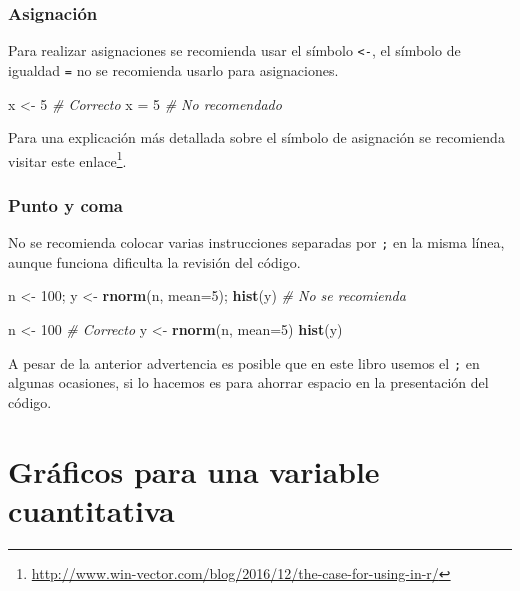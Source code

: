 \documentclass[10pt,]{krantz}
\makeatletter
\newenvironment{Shaded}{\begin{snugshade}}{\end{snugshade}}
\newcommand{\KeywordTok}[1]{\textcolor[rgb]{0.13,0.29,0.53}{\textbf{{#1}}}}
\newcommand{\DataTypeTok}[1]{\textcolor[rgb]{0.13,0.29,0.53}{{#1}}}
\newcommand{\DecValTok}[1]{\textcolor[rgb]{0.00,0.00,0.81}{{#1}}}
\newcommand{\StringTok}[1]{\textcolor[rgb]{0.31,0.60,0.02}{{#1}}}
\newcommand{\CommentTok}[1]{\textcolor[rgb]{0.56,0.35,0.01}{\textit{{#1}}}}
\newcommand{\NormalTok}[1]{{#1}}
\renewcommand{\href}[2]{#2\footnote{\url{#1}}}
\newenvironment{kframe}{%
\medskip{}
\setlength{\fboxsep}{.8em}
 \def\at@end@of@kframe{}%
 \ifinner\ifhmode%
  \def\at@end@of@kframe{\end{minipage}}%
  \begin{minipage}{\columnwidth}%
 \fi\fi%
 \def\FrameCommand##1{\hskip\@totalleftmargin \hskip-\fboxsep
 \colorbox{shadecolor}{##1}\hskip-\fboxsep
     \hskip-\linewidth \hskip-\@totalleftmargin \hskip\columnwidth}%
 \MakeFramed {\advance\hsize-\width
   \@totalleftmargin\z@ \linewidth\hsize
   \@setminipage}}%
 {\par\unskip\endMakeFramed%
 \at@end@of@kframe}
\renewenvironment{Shaded}{\begin{kframe}}{\end{kframe}}
\makeatother
\begin{document}
\subsection{Asignación}

Para realizar asignaciones se recomienda usar el símbolo
\texttt{\textless{}-}, el símbolo de igualdad \texttt{=} no se
recomienda usarlo para asignaciones.

\begin{Shaded}
\begin{Highlighting}[]
\NormalTok{x <-}\StringTok{ }\DecValTok{5}  \CommentTok{# Correcto}
\NormalTok{x =}\StringTok{ }\DecValTok{5}   \CommentTok{# No recomendado}
\end{Highlighting}
\end{Shaded}

Para una explicación más detallada sobre el símbolo de asignación se
recomienda visitar este
\href{http://www.win-vector.com/blog/2016/12/the-case-for-using-in-r/}{enlace}.

\subsection{Punto y coma}

No se recomienda colocar varias instrucciones separadas por \texttt{;}
en la misma línea, aunque funciona dificulta la revisión del código.

\begin{Shaded}
\begin{Highlighting}[]
\NormalTok{n <-}\StringTok{ }\DecValTok{100}\NormalTok{; y <-}\StringTok{ }\KeywordTok{rnorm}\NormalTok{(n, }\DataTypeTok{mean=}\DecValTok{5}\NormalTok{); }\KeywordTok{hist}\NormalTok{(y)  }\CommentTok{# No se recomienda}

\NormalTok{n <-}\StringTok{ }\DecValTok{100}                                  \CommentTok{# Correcto}
\NormalTok{y <-}\StringTok{ }\KeywordTok{rnorm}\NormalTok{(n, }\DataTypeTok{mean=}\DecValTok{5}\NormalTok{)}
\KeywordTok{hist}\NormalTok{(y)}
\end{Highlighting}
\end{Shaded}

A pesar de la anterior advertencia es posible que en este libro usemos
el \texttt{;} en algunas ocasiones, si lo hacemos es para ahorrar
espacio en la presentación del código.

\chapter{Gráficos para una variable
cuantitativa}\label{graficos-para-una-variable-cuantitativa}
\end{document}
